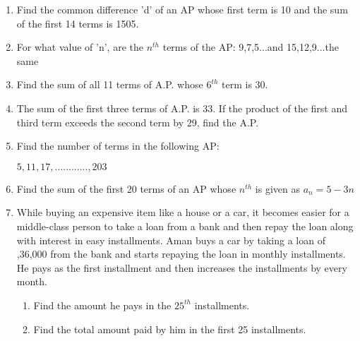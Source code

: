 \documentclass{article}
\begin{document}
\begin{enumerate}
    \item Find the common difference 'd' of an AP whose first term is 10 and the sum of the first 14 terms is 1505.
    \item For what value of 'n', are the $n^{th}$ terms of the AP: 9,7,5...and 15,12,9...the same

    \item Find the sum of all 11 terms of A.P. whose $6^{th}$ term is 30.
    \item The sum of the first three terms of A.P. is 33. If the product of the first and third term exceeds the second term by 29, find the A.P.

    \item Find the number of terms in the following AP:
    
    $5,11,17,............,203$

    \item Find the sum of the first 20 terms of an AP whose $n^{th}$ is given as $a_n= 5 - 3n$
   

    \item While buying an expensive item like a house or a car, it becomes easier for a middle-class person to take a loan from a bank and then repay the loan along with interest in easy installments. Aman buys a car by taking a loan of ,36,000 from the bank and starts repaying the loan in monthly installments. He pays  as the first installment and then increases the installments by  every month.     
    \begin{enumerate}
    
 \item Find the amount he pays in the $25^{th}$ installments.
    \item Find the total amount paid by him in the first 25 installments.

\end{enumerate}

\end{enumerate}
\end{document}
